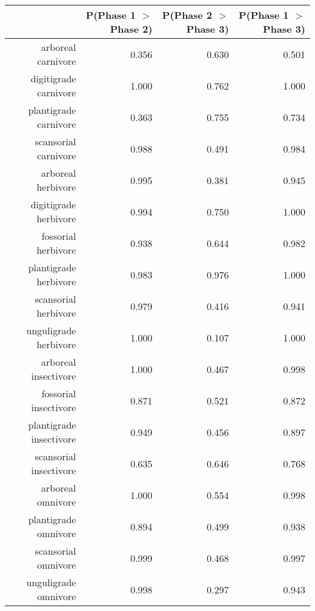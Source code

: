 \begin{table}[ht]
\centering
\begin{tabular}{rrrr}
  \hline
 & P(Phase 1 $>$ Phase 2) & P(Phase 2 $>$ Phase 3) & P(Phase 1 $>$ Phase 3) \\ 
  \hline
arboreal carnivore & 0.356 & 0.630 & 0.501 \\ 
  digitigrade carnivore & 1.000 & 0.762 & 1.000 \\ 
  plantigrade carnivore & 0.363 & 0.755 & 0.734 \\ 
  scansorial carnivore & 0.988 & 0.491 & 0.984 \\ 
  arboreal herbivore & 0.995 & 0.381 & 0.945 \\ 
  digitigrade herbivore & 0.994 & 0.750 & 1.000 \\ 
  fossorial herbivore & 0.938 & 0.644 & 0.982 \\ 
  plantigrade herbivore & 0.983 & 0.976 & 1.000 \\ 
  scansorial herbivore & 0.979 & 0.416 & 0.941 \\ 
  unguligrade herbivore & 1.000 & 0.107 & 1.000 \\ 
  arboreal insectivore & 1.000 & 0.467 & 0.998 \\ 
  fossorial insectivore & 0.871 & 0.521 & 0.872 \\ 
  plantigrade insectivore & 0.949 & 0.456 & 0.897 \\ 
  scansorial insectivore & 0.635 & 0.646 & 0.768 \\ 
  arboreal omnivore & 1.000 & 0.554 & 0.998 \\ 
  plantigrade omnivore & 0.894 & 0.499 & 0.938 \\ 
  scansorial omnivore & 0.999 & 0.468 & 0.997 \\ 
  unguligrade omnivore & 0.998 & 0.297 & 0.943 \\ 
   \hline
\end{tabular}
\label{tab:origin_plant}
\end{table}
